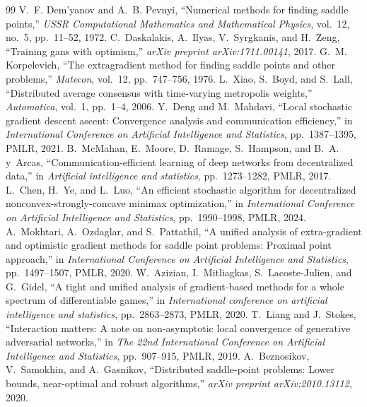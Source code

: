 \documentclass[10pt,a4paper]{amsart}
\begin{document}
\begin{thebibliography}{99}
 V.~F. Dem'yanov and A.~B. Pevnyi, ``Numerical methods for finding saddle points,'' {\em USSR Computational Mathematics and Mathematical Physics}, vol.~12, no.~5, pp.~11--52, 1972.
 C.~Daskalakis, A.~Ilyas, V.~Syrgkanis, and H.~Zeng, ``Training gans with optimism,'' {\em arXiv preprint arXiv:1711.00141}, 2017.
 G.~M. Korpelevich, ``The extragradient method for finding saddle points and other problems,'' {\em Matecon}, vol.~12, pp.~747--756, 1976.
 L.~Xiao, S.~Boyd, and S.~Lall, ``Distributed average consensus with time-varying metropolis weights,'' {\em Automatica}, vol.~1, pp.~1--4, 2006.
 Y.~Deng and M.~Mahdavi, ``Local stochastic gradient descent ascent: Convergence analysis and communication efficiency,'' in {\em International Conference on Artificial Intelligence and Statistics}, pp.~1387--1395, PMLR, 2021.
 B.~McMahan, E.~Moore, D.~Ramage, S.~Hampson, and B.~A. y~Arcas, ``Communication-efficient learning of deep networks from decentralized data,'' in {\em Artificial intelligence and statistics}, pp.~1273--1282, PMLR, 2017.
 L.~Chen, H.~Ye, and L.~Luo, ``An efficient stochastic algorithm for decentralized nonconvex-strongly-concave minimax optimization,'' in {\em International Conference on Artificial Intelligence and Statistics}, pp.~1990--1998, PMLR, 2024.
 A.~Mokhtari, A.~Ozdaglar, and S.~Pattathil, ``A unified analysis of extra-gradient and optimistic gradient methods for saddle point problems: Proximal point approach,'' in {\em International Conference on Artificial Intelligence and Statistics}, pp.~1497--1507, PMLR, 2020.
 W.~Azizian, I.~Mitliagkas, S.~Lacoste-Julien, and G.~Gidel, ``A tight and unified analysis of gradient-based methods for a whole spectrum of differentiable games,'' in {\em International conference on artificial intelligence and statistics}, pp.~2863--2873, PMLR, 2020.
 T.~Liang and J.~Stokes, ``Interaction matters: A note on non-asymptotic local convergence of generative adversarial networks,'' in {\em The 22nd International Conference on Artificial Intelligence and Statistics}, pp.~907--915, PMLR, 2019.
 A.~Beznosikov, V.~Samokhin, and A.~Gasnikov, ``Distributed saddle-point problems: Lower bounds, near-optimal and robust algorithms,'' {\em arXiv preprint arXiv:2010.13112}, 2020.

\end{thebibliography}
\end{document}
